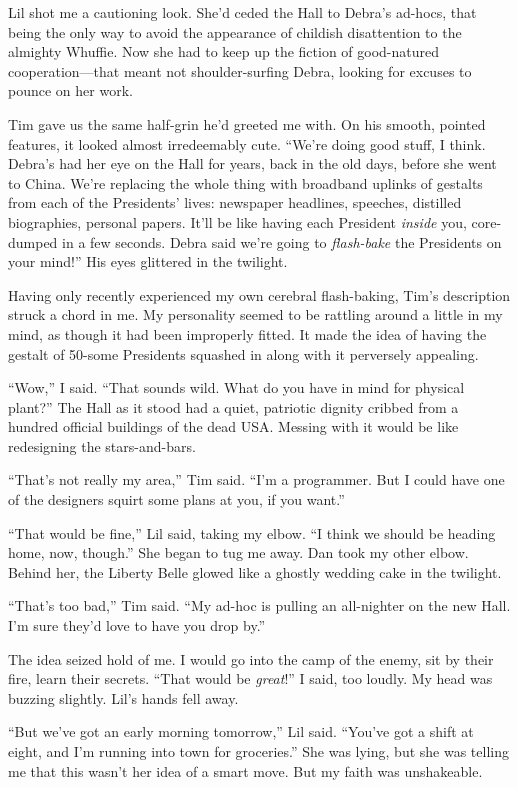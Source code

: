 Lil shot me a cautioning look. She'd ceded the Hall to Debra's
ad-hocs, that being the only way to avoid the appearance of
childish disattention to the almighty Whuffie. Now she had to keep
up the fiction of good-natured cooperation—that meant not
shoulder-surfing Debra, looking for excuses to pounce on her work.

Tim gave us the same half-grin he'd greeted me with. On his smooth,
pointed features, it looked almost irredeemably cute. “We're doing
good stuff, I think. Debra's had her eye on the Hall for years,
back in the old days, before she went to China. We're replacing the
whole thing with broadband uplinks of gestalts from each of the
Presidents' lives: newspaper headlines, speeches, distilled
biographies, personal papers. It'll be like having each President
\emph{inside} you, core-dumped in a few seconds. Debra said we're
going to \emph{flash-bake} the Presidents on your mind!” His eyes
glittered in the twilight.

Having only recently experienced my own cerebral flash-baking,
Tim's description struck a chord in me. My personality seemed to be
rattling around a little in my mind, as though it had been
improperly fitted. It made the idea of having the gestalt of
50-some Presidents squashed in along with it perversely appealing.

“Wow,” I said. “That sounds wild. What do you have in mind for
physical plant?” The Hall as it stood had a quiet, patriotic
dignity cribbed from a hundred official buildings of the dead USA.
Messing with it would be like redesigning the stars-and-bars.

“That's not really my area,” Tim said. “I'm a programmer. But I
could have one of the designers squirt some plans at you, if you
want.”

“That would be fine,” Lil said, taking my elbow. “I think we should
be heading home, now, though.” She began to tug me away. Dan took
my other elbow. Behind her, the Liberty Belle glowed like a ghostly
wedding cake in the twilight.

“That's too bad,” Tim said. “My ad-hoc is pulling an all-nighter on
the new Hall. I'm sure they'd love to have you drop by.”

The idea seized hold of me. I would go into the camp of the enemy,
sit by their fire, learn their secrets. “That would be
\emph{great}!” I said, too loudly. My head was buzzing slightly.
Lil's hands fell away.

“But we've got an early morning tomorrow,” Lil said. “You've got a
shift at eight, and I'm running into town for groceries.” She was
lying, but she was telling me that this wasn't her idea of a smart
move. But my faith was unshakeable.

